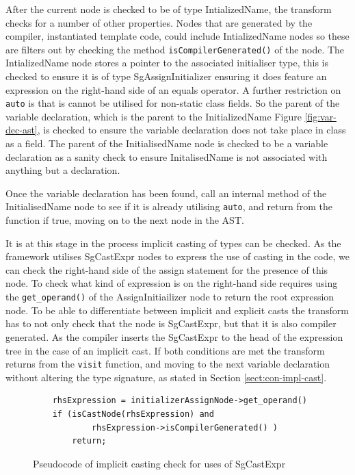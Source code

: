 \documentclass[bsc,frontabs,singlespacing,twoside,parskip,deptreport]{infthesis}
\begin{document}
After the current node is checked to be of type IntializedName, the transform checks for a number of other properties. Nodes that are generated by the compiler, instantiated template code, could include IntializedName nodes so these are filters out by checking the method \texttt{isCompilerGenerated()} of the node. The IntializedName node stores a pointer to the associated initialiser type, this is checked to ensure it is of type SgAssignInitializer ensuring it does feature an expression on the right-hand side of an equals operator. A further restriction on \texttt{auto} is that is cannot be utilised for non-static class fields. So the parent of the variable declaration, which is the parent to the InitializedName Figure \ref{fig:var-dec-ast}, is checked to ensure the variable declaration does not take place in class as a field. The parent of the InitialisedName node is checked to be a variable declaration as a sanity check to ensure InitalisedName is not associated with anything but a declaration. 

Once the variable declaration has been found, call an internal method of the InitialisedName node to see if it is already utilising \texttt{auto}, and return from the function if true, moving on to the next node in the AST. 

It is at this stage in the process implicit casting of types can be checked. As the framework utilises SgCastExpr nodes to express the use of casting in the code, we can check the right-hand side of the assign statement for the presence of this node. To check what kind of expression is on the right-hand side requires using the \texttt{get\_operand()} of the AssignInitiailizer node to return the root expression node. To be able to differentiate between implicit and explicit casts the transform has to not only check that the node is SgCastExpr, but that it is also compiler generated. As the compiler inserts the SgCastExpr to the head of the expression tree in the case of an implicit cast. If both conditions are met the transform returns from the \texttt{visit} function, and moving to the next variable declaration without altering the type signature, as stated in Section \ref{sect:con-impl-cast}. 

\begin{figure}[!h]
    \centering
    \begin{verbatim}
    rhsExpression = initializerAssignNode->get_operand()
    if (isCastNode(rhsExpression) and 
            rhsExpression->isCompilerGenerated() )
        return;
    \end{verbatim}
    \caption{Pseudocode of implicit casting check for uses of SgCastExpr}
    \label{fig:cast-check-code}
\end{figure}
\end{document}
